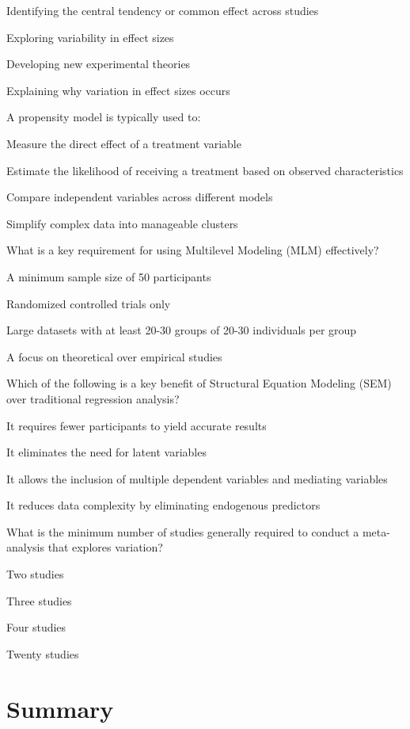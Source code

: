 \documentclass[
  letterpaper,
  DIV=11,
  numbers=noendperiod]{scrreprt}
\begin{document}
Identifying the central tendency or common effect across studies

Exploring variability in effect sizes

Developing new experimental theories

Explaining why variation in effect sizes occurs

A propensity model is typically used to:

Measure the direct effect of a treatment variable

Estimate the likelihood of receiving a treatment based on observed
characteristics

Compare independent variables across different models

Simplify complex data into manageable clusters

What is a key requirement for using Multilevel Modeling (MLM)
effectively?

A minimum sample size of 50 participants

Randomized controlled trials only

Large datasets with at least 20-30 groups of 20-30 individuals per group

A focus on theoretical over empirical studies

Which of the following is a key benefit of Structural Equation Modeling
(SEM) over traditional regression analysis?

It requires fewer participants to yield accurate results

It eliminates the need for latent variables

It allows the inclusion of multiple dependent variables and mediating
variables

It reduces data complexity by eliminating endogenous predictors

What is the minimum number of studies generally required to conduct a
meta-analysis that explores variation?

Two studies

Three studies

Four studies

Twenty studies


\chapter*{Summary}\label{summary-2}

\end{document}
